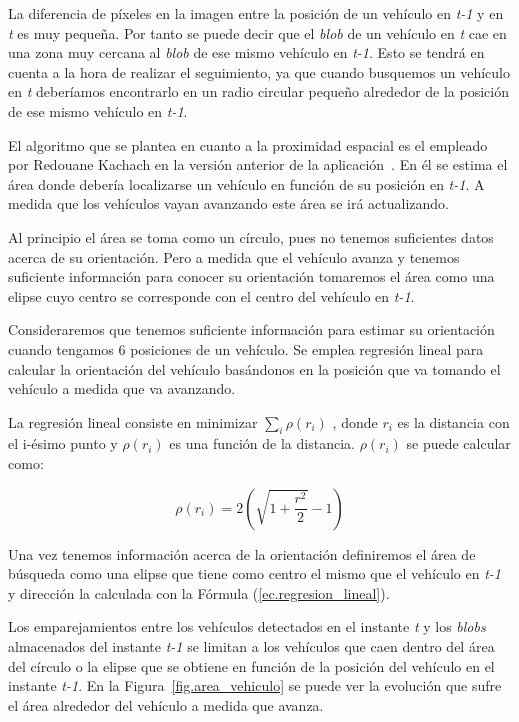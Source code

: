 La diferencia de píxeles en la imagen entre la posición de un vehículo en \textit{t-1} y en \textit{t} es muy pequeña. Por tanto se puede decir que el \textit{blob} de un vehículo en \textit{t} cae en una zona muy cercana al \textit{blob} de ese mismo vehículo en \textit{t-1}. Esto se tendrá en cuenta a la hora de realizar el seguimiento, ya que cuando busquemos un vehículo en \textit{t} deberíamos encontrarlo en un radio circular pequeño alrededor de la posición de ese mismo vehículo en \textit{t-1}. 

El algoritmo que se plantea en cuanto a la proximidad espacial es el empleado por Redouane Kachach en la versión anterior de la aplicación~\cite{redo_tesis}. En él se estima el área donde debería localizarse un vehículo en función de su posición en \textit{t-1}. A medida que los vehículos vayan avanzando este área se irá actualizando.

Al principio el área se toma como un círculo, pues no tenemos suficientes datos acerca de su orientación. Pero a medida que el vehículo avanza y tenemos suficiente información para conocer su orientación tomaremos el área como una elipse cuyo centro se corresponde con el centro del vehículo en \textit{t-1}. 

Consideraremos que tenemos suficiente información para estimar su orientación cuando tengamos 6 posiciones de un vehículo. Se emplea regresión lineal para calcular la orientación del vehículo basándonos en la posición que va tomando el vehículo a medida que va avanzando. 

La regresión lineal consiste en minimizar $\sum_{i}\rho(r_i)$ , donde $r_i$  es la  distancia  con  el  i-ésimo  punto  y $\rho(r_i)$ es una función de la distancia. $\rho(r_i)$ se puede calcular como:

\begin{equation}\label{ec.regresion_lineal}
   \rho(r_i) = 2(\sqrt{1 +\frac{r^2}{2}} - 1) 
\end{equation}

Una vez tenemos información acerca de la orientación definiremos el área de búsqueda como una elipse que tiene como centro el mismo que el vehículo en \textit{t-1} y dirección la calculada con la Fórmula (\ref{ec.regresion_lineal}).

Los emparejamientos entre los vehículos detectados en el instante \textit{t} y los \textit{blobs} almacenados del instante \textit{t-1} se limitan a los vehículos que caen dentro del área del círculo o la elipse que se obtiene en función de la posición del vehículo en el instante \textit{t-1}. En la Figura~\ref{fig.area_vehiculo} se puede ver la evolución que sufre el área alrededor del vehículo a medida que avanza.

